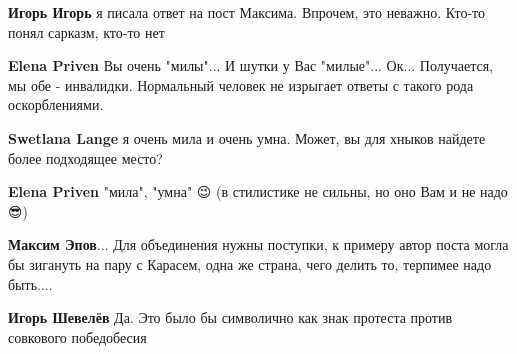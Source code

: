 \begin{itemize}
\begin{itemize}
\textbf{Игорь Игорь} я писала ответ на пост Максима. Впрочем, это неважно. Кто-то понял сарказм, кто-то нет

 
\textbf{Elena Priven} Вы очень "милы"... И шутки у Вас "милые"... Ок... Получается, мы обе - инвалидки. Нормальный человек не изрыгает ответы с такого рода оскорблениями.

 
\textbf{Swetlana Lange} я очень мила и очень умна. Может, вы для хныков найдете более подходящее место?

 
\textbf{Elena Priven} "мила", "умна" 😉 (в стилистике не сильны, но оно Вам и не надо😎)

 
\textbf{Максим Эпов}... Для объединения нужны поступки, к примеру автор поста могла бы зигануть на пару с Карасем, одна же страна, чего делить то, терпимее надо быть....

 
\textbf{Игорь Шевелёв} Да. Это было бы символично как знак протеста против совкового победобесия

 

\end{itemize}
\end{itemize}
